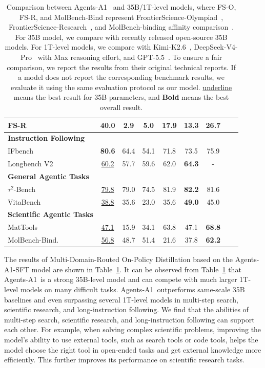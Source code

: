 \documentclass{llmxive}
\providecommand{\ProjectName}{Agents-A1}
\begin{document}
\begin{table}[]
\begin{tabular}{@{}lcccccccc@{}}
    FS-R~\citep{frontierscience} & \textbf{40.0} & 2.9 & 5.0 & 17.9 & 13.3 & 26.7 \\
    \midrule
    \textbf{Instruction Following} & & & & & & \\
    \midrule
    IFbench~\citep{IFBench} & \textbf{80.6} & 64.4 & 54.1 & 71.8 & 73.5 & 75.9 \\
    Longbench V2~\citep{LongBench} & \underline{60.2} & 57.7 & 59.6 & 62.0 & \textbf{64.3} & -\\
    \midrule
    \textbf{General Agentic Tasks} & & & & & & \\
    \midrule
    $\tau^2$-Bench~\citep{barres2025tau2} & \underline{79.8} & 79.0 & 74.5 & 81.9 & \textbf{82.2} & 81.6 \\
    VitaBench~\citep{he2025vitabench} & \underline{38.8} & 35.6 & 23.0 & 35.6 & \textbf{49.0} & 45.0 \\
    \midrule
    \textbf{Scientific Agentic Tasks} & & & & & & \\
    \midrule
    MatTools~\citep{MatTools} & \underline{47.1} & 15.9 & 34.1 & 63.8 & 47.1 & \textbf{68.8} \\
    MolBench-Bind.~\citep{zhang2026molclaw} & \underline{56.8} & 48.7 & 51.4 & 21.6 & 37.8 & \textbf{62.2} \\
    \bottomrule
    \end{tabular}
\caption{Comparison between \ProjectName~ and 35B/1T-level models, where FS-O, FS-R, and MolBench-Bind represent FrontierScience-Olympiad~\citep{frontierscience}, FrontierScience-Research~\citep{frontierscience}, and MolBench-binding affinity comparison~\citep{zhang2026molclaw}. For 35B model, we compare with recently released open-source 35B models. For 1T-level models, we compare with Kimi-K2.6~\citep{kimi2.6}, DeepSeek-V4-Pro~\citep{deepseekai2026deepseekv4} with Max reasoning effort, and GPT-5.5~\citep{GPT5.5}. To ensure a fair comparison, we report the results from their original technical reports. If a model does not report the corresponding benchmark results, we evaluate it using the same evaluation protocol as our model. \underline{underline} means the best result for 35B parameters, and \textbf{Bold} means the best overall result. }
\label{tab:main_results}
\end{table}


The results of Multi-Domain-Routed On-Policy Distillation based on the \ProjectName-SFT model are shown in Table~\ref{tab:main_results}. It can be observed from Table~\ref{tab:main_results} that \ProjectName~is a strong 35B-level model and can compete with much larger 1T-level models on many difficult tasks. \ProjectName~outperforms same-scale 35B baselines and even surpassing several 1T-level models in multi-step search, scientific research, and long-instruction following. We find that the abilities of multi-step search, scientific research, and long-instruction following can support each other. For example, when solving complex scientific problems, improving the model’s ability to use external tools, such as search tools or code tools, helps the model choose the right tool in open-ended tasks and get external knowledge more efficiently. This further improves its performance on scientific research tasks.
\end{document}
